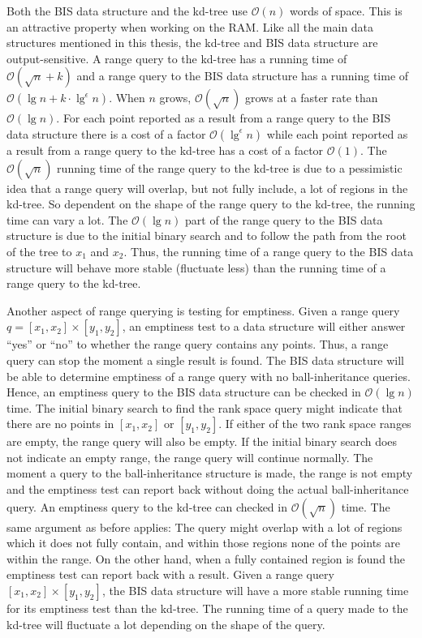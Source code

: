Both the BIS data structure and the kd-tree use $\mathcal{O}(n)$ words of space. This is an attractive property when working on the RAM. Like all the main data structures mentioned in this thesis, the kd-tree and BIS data structure are output-sensitive. A range query to the kd-tree has a running time of $\mathcal{O}(\sqrt{n}+k)$ and a range query to the BIS data structure has a running time of $\mathcal{O}(\lg n + k\cdot\lg^\epsilon n)$. When $n$ grows, $\mathcal{O}(\sqrt{n})$ grows at a faster rate than $\mathcal{O}(\lg n)$. For each point reported as a result from a range query to the BIS data structure there is a cost of a factor $\mathcal{O}(\lg^\epsilon n)$ while each point reported as a result from a range query to the kd-tree has a cost of a factor $\mathcal{O}(1)$. The $\mathcal{O}(\sqrt{n})$ running time of the range query to the kd-tree is due to a pessimistic idea that a range query will overlap, but not fully include, a lot of regions in the kd-tree. So dependent on the shape of the range query to the kd-tree, the running time can vary a lot. The $\mathcal{O}(\lg n)$ part of the range query to the BIS data structure is due to the initial binary search and to follow the path from the root of the tree to $x_1$ and $x_2$. Thus, the running time of a range query to the BIS data structure will behave more stable (fluctuate less) than the running time of a range query to the kd-tree. 


Another aspect of range querying is testing for emptiness. Given a range query $q = [x_1, x_2] \times [y_1, y_2]$, an emptiness test to a data structure will either answer ``yes'' or ``no'' to whether the range query contains any points. Thus, a range query can stop the moment a single result is found. The BIS data structure will be able to determine emptiness of a range query with no ball-inheritance queries. Hence, an emptiness query to the BIS data structure can be checked in $\mathcal{O}(\lg n)$ time. The initial binary search to find the rank space query might indicate that there are no points in $[x_1, x_2]$ or $[y_1, y_2]$. If either of the two rank space ranges are empty, the range query will also be empty. If the initial binary search does not indicate an empty range, the range query will continue normally. The moment a query to the ball-inheritance structure is made, the range is not empty and the emptiness test can report back without doing the actual ball-inheritance query. An emptiness query to the kd-tree can checked in $\mathcal{O}(\sqrt{n})$ time. The same argument as before applies: The query might overlap with a lot of regions which it does not fully contain, and within those regions none of the points are within the range. On the other hand, when a fully contained region is found the emptiness test can report back with a result. Given a range query $[x_1, x_2] \times [y_1, y_2]$, the BIS data structure will have a more stable running time for its emptiness test than the kd-tree. The running time of a query made to the kd-tree will fluctuate a lot depending on the shape of the query.
